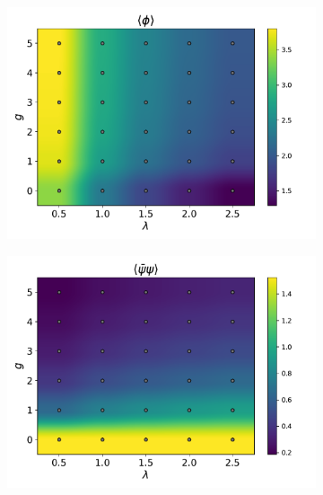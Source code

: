 \begin{figure}[htp]
    \centering
    \begin{subfigure}[b]{0.48\textwidth}
        \includegraphics[width=\textwidth]{figures/phase_diagram/g-lam/phase_diagram_phi.pdf}
    \end{subfigure}
    \begin{subfigure}[b]{0.48\textwidth}
        \includegraphics[width=\textwidth]{figures/phase_diagram/g-lam/phase_diagram_cond.pdf}
    \end{subfigure}
    \begin{subfigure}[b]{0.48\textwidth}

\end{subfigure}
\end{figure}
